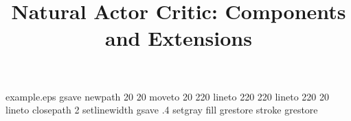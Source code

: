 %
%
%
%
%
\begin{filecontents*}{example.eps}
gsave
newpath
  20 20 moveto
  20 220 lineto
  220 220 lineto
  220 20 lineto
closepath
2 setlinewidth
gsave
  .4 setgray fill
grestore
stroke
grestore
\end{filecontents*}
%
\RequirePackage{fix-cm}
%
\documentclass[smallextended]{svjour3}       %
%
\smartqed  %
%
\usepackage{graphicx}

%
%

\usepackage{natbib} %
\usepackage{amsmath, amssymb}
\usepackage{algorithm}
\usepackage{algorithmic}


\newcommand{\x}{\item}
\newcommand{\parTitle}[1]{\textbf{#1:}}
\DeclareMathOperator{\E}{\mathbb{E}}

%
%

\title{Natural Actor Critic: Components and Extensions
}

